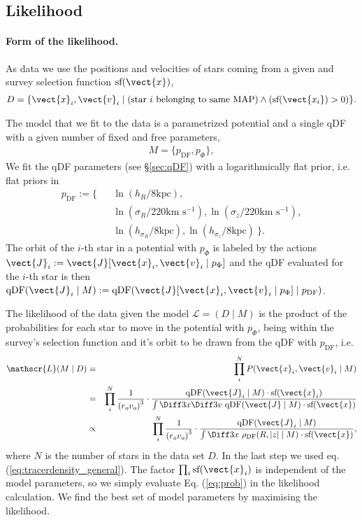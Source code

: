 \subsection{Likelihood}

\paragraph{Form of the likelihood.}  As data we use the positions and velocities of stars coming from a given \MAP and survey selection function $\text{sf}(\vect{x})$,
\begin{eqnarray*}
D  =\{ \vect{x}_i,\vect{v}_i \mid \text{(star $i$ belonging to same MAP)} \wedge (\text{sf}(\vect{x_i}) > 0) \}.
\end{eqnarray*}

The model that we fit to the data is a parametrized potential and a single qDF with a given number of fixed and free parameters,
\begin{eqnarray*}
M =\{ p_\text{DF} , p_\Phi \},
\end{eqnarray*}
We fit the qDF parameters (see \S\ref{sec:qDF}) with a logarithmically flat prior, i.e. flat priors in
\begin{eqnarray*}
p_\text{DF} := \{&& \ln \left(h_R/8\text{kpc}\right), \\
&& \ln \left(\sigma_R/220\text{km s$^{-1}$}\right), \ln \left(\sigma_z/220\text{km s$^{-1}$}\right), \\
&& \ln \left(h_{\sigma_R}/8\text{kpc}\right), \ln \left(h_{\sigma_z}/8\text{kpc}\right)\ \}.
\end{eqnarray*}
The orbit of the $i$-th star in a potential with $p_\Phi$ is labeled by the actions $\vect{J}_i := \vect{J}[\vect{x}_i,\vect{v}_i\mid p_{\Phi}]$ and the qDF evaluated for the $i$-th star is then $\text{qDF}(\vect{J}_i \mid M) := \text{qDF}(\vect{J}[\vect{x}_i,\vect{v}_i\mid p_{\Phi}] \mid p_\text{DF})$.

The likelihood of the data given the model $\mathscr{L} = (D \mid M)$ is the product of the probabilities for each star to move in the potential with $p_\Phi$, being within the survey's selection function and it's orbit to be drawn from the qDF with $p_\text{DF}$, i.e. 
\begin{eqnarray}
\mathscr{L}(M \mid D) &\equiv& \prod_i^{N} P(\vect{x}_i,\vect{v}_i \mid M) \nonumber\\
&=& \prod_i^{N} \frac{1}{\left(r_o v_o\right)^3} \cdot \frac{\text{qDF}(\vect{J}_i \mid M) \cdot \text{sf}(\vect{x}_i)}{\int \Diff 3 x \Diff 3 v \  \text{qDF}(\vect{J} \mid M) \cdot \text{sf}(\vect{x})}\nonumber\\
&\propto& \prod_i^{N} \frac{1}{\left(r_o v_o\right)^3} \cdot \frac{\text{qDF}(\vect{J}_i \mid M)}{\int \Diff 3 x \  \rho_\text{DF}(R,|z| \mid M) \cdot \text{sf}(\vect{x})}, \label{eq:prob}
\end{eqnarray}
where $N$ is the number of stars in the data set $D$.
In the last step we used eq. (\ref{eq:tracerdensity_general}). The factor $\prod_i\text{sf}(\vect{x}_i)$ is independent of the model parameters, so we  simply evaluate Eq. (\ref{eq:prob}) in the likelihood calculation. We find the best set of model parameters by maximising the likelihood. 


